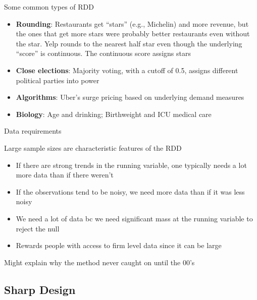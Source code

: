\documentclass{beamer}
\begin{document}
\begin{frame}{Some common types of RDD}

		\begin{itemize}
		\item \textbf{Rounding}: Restaurants get ``stars'' (e.g., Michelin) and more revenue, but the ones that get more stars were probably better restaurants even without the star.  Yelp rounds to the nearest half star even though the underlying ``score'' is continuous.  The continuous score assigns stars
		\item \textbf{Close elections}: Majority voting, with a cutoff of 0.5, assigns different political parties into power
		\item \textbf{Algorithms}: Uber's surge pricing based on underlying demand measures 
		\item \textbf{Biology}: Age and drinking; Birthweight and ICU medical care
		\end{itemize}

\end{frame}

\begin{frame}{Data requirements}

Large sample sizes are characteristic features of the RDD

		\begin{itemize}
		\item If there are strong trends in the running variable, one typically needs a lot more data than if there weren't
		\item If the observations tend to be noisy, we need more data than if it was less noisy
		\item We need a lot of data bc we need significant mass at the running variable to reject the null
		\item Rewards people with access to firm level data since it can be large
		\end{itemize}
Might explain why the method never caught on until the 00's	


\end{frame}




\subsection{Sharp Design}
\end{document}

